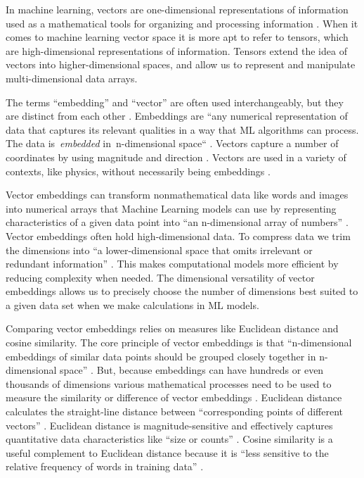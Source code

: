 In machine learning, vectors are one-dimensional representations of information used as a mathematical tools for organizing and processing information \citep{bergmann_what_2024}. When it comes to machine learning vector space it is more apt to refer to tensors, which are high-dimensional representations of information. Tensors extend the idea of vectors into higher-dimensional spaces, and allow us to represent and manipulate multi-dimensional data arrays.

The terms “embedding” and “vector” are often used interchangeably, but they are distinct from each other \citep{bergmann_what_2024}. Embeddings are “any numerical representation of data that captures its relevant qualities in a way that ML algorithms can process. The data is \textit{embedded} in n-dimensional space“ \citep{bergmann_what_2024}. Vectors capture a number of coordinates by using magnitude and direction \citep{weisstein_vector_nodate,frank_introduction_nodate}. Vectors are used in a variety of contexts, like physics, without necessarily being embeddings \citep{bergmann_what_2024}. 

Vector embeddings can transform nonmathematical data like words and images into numerical arrays that Machine Learning models can use by representing characteristics of a given data point into “an n-dimensional array of numbers” \citep{bergmann_what_2024}. Vector embeddings often hold high-dimensional data. To compress data we trim the dimensions into “a lower-dimensional space that omits irrelevant or redundant information” \citep{bergmann_what_2024}. This makes computational models more efficient by reducing complexity when needed. The dimensional versatility of vector embeddings allows us to precisely choose the number of dimensions best suited to a given data set when we make calculations in ML models.

Comparing vector embeddings relies on measures like Euclidean distance and cosine similarity. The core principle of vector embeddings is that “n-dimensional embeddings of similar data points should be grouped closely together in n-dimensional space” \citep{bergmann_what_2024}. But, because embeddings can have hundreds or even thousands of dimensions various mathematical processes need to be used to measure the similarity or difference of vector embeddings \citep{bergmann_what_2024}. Euclidean distance calculates the straight-line distance between “corresponding points of different vectors” \citep{bergmann_what_2024}. Euclidean distance is magnitude-sensitive and effectively captures quantitative data characteristics like “size or counts” \citep{bergmann_what_2024}. Cosine similarity is a useful complement to Euclidean distance because it is “less sensitive to the relative frequency of words in training data” \citep{bergmann_what_2024}.
